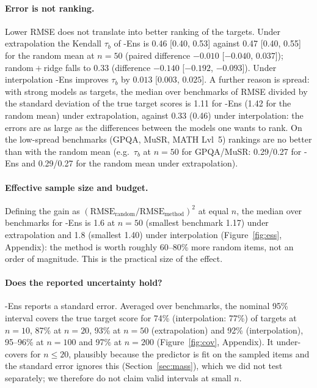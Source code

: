 \paragraph{Error is not ranking.}
Lower RMSE does not translate into better ranking of the targets. Under extrapolation the Kendall $\tau_b$ of \mass{}-Ens is 0.46 [0.40, 0.53] against 0.47 [0.40, 0.55] for the random mean at $n=50$ (paired difference $-0.010$ [$-0.040$, $0.037$]); random${}+{}$ridge falls to 0.33 (difference $-0.140$ [$-0.192$, $-0.093$]). Under interpolation \mass{}-Ens improves $\tau_b$ by $0.013$ [$0.003$, $0.025$]. A further reason is spread: with strong models as targets, the median over benchmarks of RMSE divided by the standard deviation of the true target scores is 1.11 for \mass{}-Ens (1.42 for the random mean) under extrapolation, against 0.33 (0.46) under interpolation: the errors are as large as the differences between the models one wants to rank. On the low-spread benchmarks (GPQA, MuSR, MATH Lvl~5) rankings are no better than with the random mean (e.g.\ $\tau_b$ at $n=50$ for GPQA/MuSR: 0.29/0.27 for \mass{}-Ens and 0.29/0.27 for the random mean under extrapolation).

\paragraph{Effective sample size and budget.}
Defining the gain as $(\mathrm{RMSE}_{\text{random}}/\mathrm{RMSE}_{\text{method}})^2$ at equal $n$, the median over benchmarks for \mass{}-Ens is 1.6 at $n=50$ (smallest benchmark 1.17) under extrapolation and 1.8 (smallest 1.40) under interpolation (Figure~\ref{fig:ess}, Appendix): the method is worth roughly 60--80\% more random items, not an order of magnitude. This is the practical size of the effect.

\paragraph{Does the reported uncertainty hold?}
\mass{}-Ens reports a standard error. Averaged over benchmarks, the nominal 95\% interval covers the true target score for 74\% (interpolation: 77\%) of targets at $n=10$, 87\% at $n=20$, 93\% at $n=50$ (extrapolation) and 92\% (interpolation), 95--96\% at $n=100$ and 97\% at $n=200$ (Figure~\ref{fig:cov}, Appendix). It under-covers for $n\le20$, plausibly because the predictor is fit on the sampled items and the standard error ignores this (Section~\ref{sec:mass}), which we did not test separately; we therefore do not claim valid intervals at small $n$.

